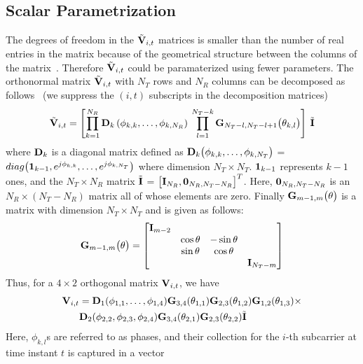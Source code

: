 \documentclass[journal,10pt,twocolumn]{IEEEtran}
\def\bD{{\bf D}}
\def\bG{{\bf G}}
\def\bI{{\bf I}}
\def\bV{{\bf V}}
\begin{document}
\subsection{Scalar Parametrization}
\label{givens}
The degrees of freedom in the $\tilde{\bV}_{i,t}$ matrices is smaller
than the number of real entries in the matrix because of the
geometrical structure between the columns of the
matrix~\cite{4114278}.  Therefore $\tilde{\bV}_{i,t}$ could be paramaterized
using fewer parameters.
The orthonormal matrix $\tilde{\bV}_{i,t}$ with
$N_T$ rows and $N_R$ columns can be decomposed as
follows~\cite{4114278} (we suppress the $(i, t)$ subscripts in the
decomposition matrices)
\begin{equation}
\label{eq:decompose}
\tilde{\bV}_{i,t} = \left[\prod_{k=1}^{N_{R}} \bD_{k} \left( \phi_{k,k},\ldots , \phi_{k,N_{R}} \right) \:  \prod_{l=1}^{N_{T}-k} \bG_{N_{T}-l,N_{T} -l+1} \big( \theta_{k,l}\big)  \right] \: \tilde{\bI}
\end{equation}
where $\bD_{k}$ is a diagonal matrix defined as
$\bD_{k}\big(\phi_{k,k}, \ldots, \phi_{k,N_T } \big)$ =
$\mbox{diag}\big( {\bf 1}_{k-1}, e^{j\phi_{k,k}},\ldots,
e^{j\phi_{k,N_T }} \big)$ where  dimension $N_T \times N_T$. ${\bf 1}_{k-1}$ represents $k-1$ ones,
and the $N_T \times N_R$ matrix $\tilde{\bI}$ =
$\big[\bI_{N_R }, {\bf 0}_{N_R ,N_T -N_R}\big]^{T}$. Here,
${\bf 0}_{N_R ,N_T -N_R }$ is an $N_R\times (N_T - N_R)$ matrix all of
whose elements are zero. Finally $\bG_{m-1,m}\big(\theta\big)$ is a matrix with dimension $N_T \times N_T$ and is given as follows:
\begin{equation}
\bG_{m-1,m}\big(\theta\big)  =
\begin{bmatrix}
\bI_{m-2} & & & \\
& \cos\theta & -\sin\theta & \\
& \sin\theta & \cos\theta & \\
& & & \bI_{N_T -m}
\end{bmatrix}
\end{equation}
Thus, for a $4 \times 2$ orthogonal matrix $\bV_{i,t}$, we have
\begin{align*}
  \bV_{i,t} & =
  \bD_{1}(\phi_{1,1},\ldots,\phi_{1,4})\bG_{3,4}(\theta_{1,1})
  \bG_{2,3}(\theta_{1,2}) \bG_{1,2}(\theta_{1,3})\times\\
& \bD_{2}(\phi_{2,2},\phi_{2,3},\phi_{2,4}) \bG_{3,4}(\theta_{2,1}) \bG_{2,3}(\theta_{2,2})\tilde{\bI}
\end{align*}
Here, $\phi_{k,l}$s are referred to as phases, and their collection
for the $i$-th subcarrier at time instant $t$ is captured in a vector
\end{document}
